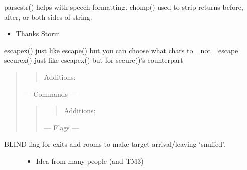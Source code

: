 \documentclass[letterpaper,10pt,english]{sphinxmanual}
\begin{document}
\sphinxAtStartPar
parsestr() \sphinxhyphen{}  helps with speech formatting.
chomp() \sphinxhyphen{} used to strip returns before, after, or both sides of string.
\begin{itemize}
\item {} 
\sphinxAtStartPar
Thanks Storm

\end{itemize}

\sphinxAtStartPar
escapex() \sphinxhyphen{} just like escape() but you can choose what chars to \_not\_ escape
securex() \sphinxhyphen{} just like escapex() but for secure()’s counterpart
\begin{quote}
\begin{quote}

\sphinxAtStartPar
Additions:
\end{quote}

\sphinxAtStartPar
— Commands —
\begin{quote}
\begin{quote}

\sphinxAtStartPar
Additions:
\end{quote}

\sphinxAtStartPar
— Flags —
\end{quote}
\end{quote}
\begin{description}
\item[{BLIND \sphinxhyphen{} flag for exits and rooms to make target arrival/leaving ‘snuffed’.}] \leavevmode\begin{itemize}
\item {} 
\sphinxAtStartPar
Idea from many people (and TM3)

\end{itemize}

\end{description}
\end{document}
